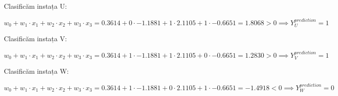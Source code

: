 \documentclass{article}
\begin{document}
Clasificăm instața U:

\( w_0 + w_1 \cdot x_1 + w_2 \cdot x_2 + w_3 \cdot x_3 
= 0.3614 + 0 \cdot -1.1881 + 1 \cdot 2.1105 + 1 \cdot -0.6651 
= 1.8068 > 0 \implies Y_U^{prediction} = 1 \)

Clasificăm instața V:

\( w_0 + w_1 \cdot x_1 + w_2 \cdot x_2 + w_3 \cdot x_3 
= 0.3614 + 1 \cdot -1.1881 + 1 \cdot 2.1105 + 0 \cdot -0.6651 
= 1.2830 > 0 \implies Y_V^{prediction} = 1 \)

Clasificăm instața W:

\( w_0 + w_1 \cdot x_1 + w_2 \cdot x_2 + w_3 \cdot x_3 
= 0.3614 + 1 \cdot -1.1881 + 0 \cdot 2.1105 + 1 \cdot -0.6651 
= -1.4918 < 0 \implies Y_W^{prediction} = 0 \)
\end{document}
